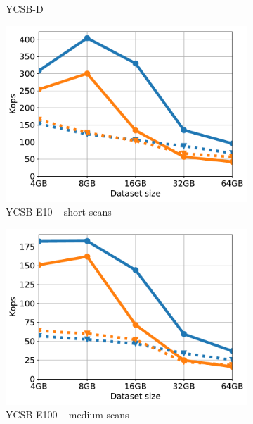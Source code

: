 \begin{figure}[tb]
\begin{subfigure}{0.33\linewidth}
\caption{YCSB-D}
\label{fig:throughput:d}
\end{subfigure}
\hspace{70pt}
\begin{subfigure}{0.33\linewidth}
\includegraphics[width=\textwidth]{figs/Workload_E-_line.pdf}
\caption{YCSB-E10 -- short scans}
\label{fig:throughput:e10}
\end{subfigure}
\begin{subfigure}{0.33\linewidth}
\includegraphics[width=\textwidth]{figs/Workload_E_line.pdf}
\caption{YCSB-E100 -- medium scans}
\label{fig:throughput:e100}
\end{subfigure}
\begin{subfigure}{0.33\linewidth}

\end{subfigure}
\end{figure}
